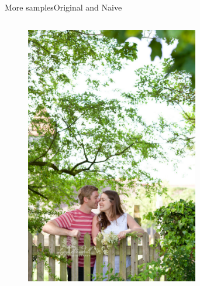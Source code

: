 \documentclass{beamer}
\begin{document}
\begin{frame}{More samples}{Original and Naive}
\begin{columns}
\begin{column}{5cm}
	\begin{figure}
		\includegraphics[width=0.8\textwidth]{example} 
		\end{figure}
\end{column}
\begin{column}{5cm}
	\begin{figure}

\end{figure}
\end{column}
\end{columns}
\end{frame}
\end{document}
